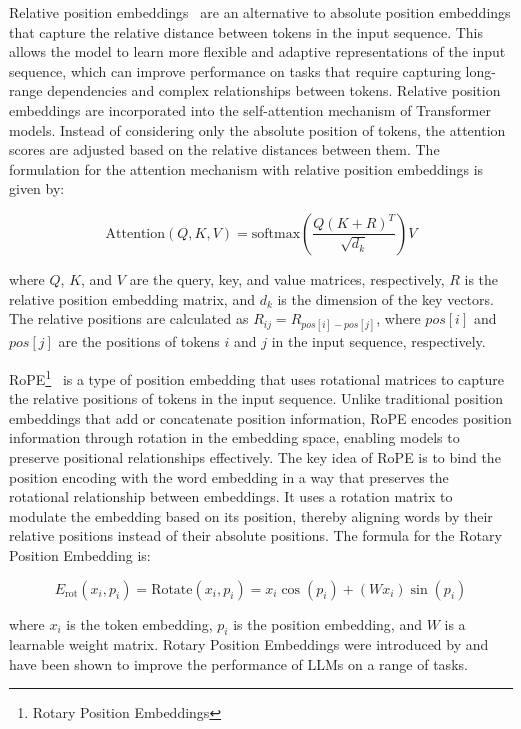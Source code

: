 Relative position embeddings~\cite{shaw2018self} are an alternative to absolute position embeddings that capture the relative distance between tokens in the input sequence.
This allows the model to learn more flexible and adaptive representations of the input sequence, which can improve performance on tasks that require capturing long-range dependencies and complex relationships between tokens.
Relative position embeddings are incorporated into the self-attention mechanism of Transformer models.
Instead of considering only the absolute position of tokens, the attention scores are adjusted based on the relative distances between them.
The formulation for the attention mechanism with relative position embeddings is given by:

\begin{equation}
	\text{Attention}(Q, K, V) = \text{softmax}\left(\frac{Q(K+R)^T}{\sqrt{d_k}}\right)V
	\label{eq:relative-position-embeddings}
\end{equation}

\noindent where \(Q\), \(K\), and \(V\) are the query, key, and value matrices, respectively, \(R\) is the relative position embedding matrix, and \(d_k\) is the dimension of the key vectors.
The relative positions are calculated as \(R_{ij} = R_{pos[i]-pos[j]}\), where \(pos[i]\) and \(pos[j]\) are the positions of tokens \(i\) and \(j\) in the input sequence, respectively.

RoPE\footnote{Rotary Position Embeddings}~\cite{su2021roformer} is a type of position embedding that uses rotational matrices to capture the relative positions of tokens in the input sequence.
Unlike traditional position embeddings that add or concatenate position information, RoPE encodes position information through rotation in the embedding space, enabling models to preserve positional relationships effectively.
The key idea of RoPE is to bind the position encoding with the word embedding in a way that preserves the rotational relationship between embeddings.
It uses a rotation matrix to modulate the embedding based on its position, thereby aligning words by their relative positions instead of their absolute positions.
The formula for the Rotary Position Embedding is:

\begin{equation}
	E_{\text{rot}}(x_i,p_i) = \text{Rotate}(x_i,p_i) = x_i\cos(p_i) + (Wx_i)\sin(p_i)
	\label{eq:rope}
\end{equation}

\noindent where \(x_i\) is the token embedding, \(p_i\) is the position embedding, and \(W\) is a learnable weight matrix.
Rotary Position Embeddings were introduced by \textcite{su2021roformer} and have been shown to improve the performance of LLMs on a range of tasks.

